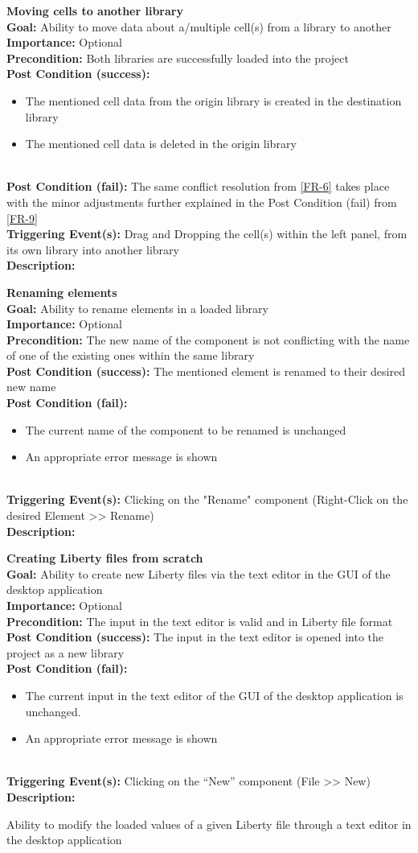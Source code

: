 \documentclass[10pt,a4paper]{report}
\newcommand{\precondition}[1]{
    \textbf{Precondition: } #1 \leavevmode \\
}
\newcommand{\FRDescription}[8]{
    \textbf{#1} \leavevmode \\
    \textbf{Goal: } #2 \leavevmode \\
    \textbf{Importance: } #3 \leavevmode \\
    \precondition{#4}
    \textbf{Post Condition (success): } #5 \leavevmode \\
    \textbf{Post Condition (fail): } #6 \leavevmode \\
    \textbf{Triggering Event(s): } #7 \leavevmode \\
    \textbf{Description: } \leavevmode \\ 
    #8}
\newcommand{\FRODescription}[8]{
    \textbf{#1} \leavevmode \\
    \textbf{Goal: } #2 \leavevmode \\
    \textbf{Importance: } #3 \leavevmode \\
    \precondition{#4}
    \textbf{Post Condition (success): } #5 \leavevmode \\
    \textbf{Post Condition (fail): } #6 \leavevmode \\
    \textbf{Triggering Event(s): } #7 \leavevmode \\
    \textbf{Description: } \leavevmode \\
    #8}
\begin{document}
\begin{FRO}
    \item \FRDescription{Moving cells to another library}
    {Ability to move data about a/multiple cell(s) from a library to another}
    {Optional}
    {Both libraries are successfully loaded into the project}
    {\begin{itemize}
        \item The mentioned cell data from the origin library is created in the destination library
        \item The mentioned cell data is deleted in the origin library
    \end{itemize}}
    {The same conflict resolution from \ref{FR-6} takes place with the minor adjustments further explained in the Post Condition (fail) from \ref{FR-9}}
    {Drag and Dropping the cell(s) within the left panel, from its own library into another library}
    \item \FRODescription{Renaming elements}
    {Ability to rename elements in a loaded library}
    {Optional}
    {The new name of the component is not conflicting with the name of one of the existing ones within the same library}
    {The mentioned element is renamed to their desired new name}
    {\begin{itemize}
        \item The current name of the component to be renamed is unchanged
        \item An appropriate error message is shown
    \end{itemize}}
    {Clicking on the "Rename" component (Right-Click on the desired Element  >> Rename)}
    \item \FRODescription{Creating Liberty files from scratch}
    {Ability to create new Liberty files via the text editor in the GUI of the desktop application}
    {Optional}
    {The input in the text editor is valid and in Liberty file format}
    {The input in the text editor is opened into the project as a new library}
    {\begin{itemize}
        \item The current input in the text editor of the GUI of the desktop application is unchanged.
        \item An appropriate error message is shown
    \end{itemize}}
    {Clicking on the “New” component (File >> New)}
    \item {}
    {Ability to modify the loaded values of a given Liberty file through a text editor in the desktop application}

\end{FRO}
\end{document}
